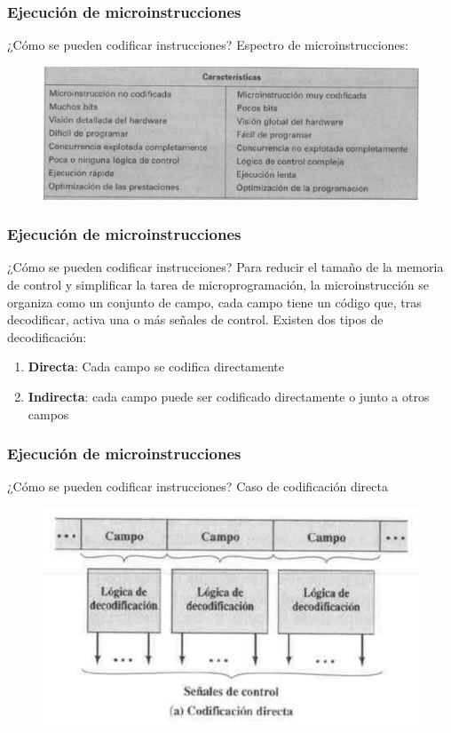 \documentclass{beamer}
\begin{document}
\begin{frame}
	\frametitle{Ejecución de microinstrucciones}
	\begin{block}{¿Cómo se pueden codificar instrucciones?}
	Espectro de microinstrucciones:
	\end{block}	
	\begin{figure}[H]
		\centering
		\includegraphics[scale=0.25]{imagenes/espectro.png} 
	\end{figure}
\end{frame}

\begin{frame}
	\frametitle{Ejecución de microinstrucciones}
	\begin{block}{¿Cómo se pueden codificar instrucciones?}
	Para reducir el tamaño de la memoria de control y simplificar la tarea de microprogramación, la microinstrucción se organiza como un conjunto de campo, cada campo tiene un código que, tras decodificar, activa una o más señales de control. Existen dos tipos de decodificación:
	\begin{enumerate}
		\item \textbf{Directa}: Cada campo se codifica directamente
		\item \textbf{Indirecta}: cada campo puede ser codificado directamente o junto a otros campos
	\end{enumerate}
	\end{block}	
\end{frame}

\begin{frame}
	\frametitle{Ejecución de microinstrucciones}
	\begin{block}{¿Cómo se pueden codificar instrucciones?}
	Caso de codificación directa
	\end{block}	
	\begin{figure}[H]
		\centering
		\includegraphics[scale=0.35]{imagenes/directa.png} 
	\end{figure}
\end{frame}
\end{document}
